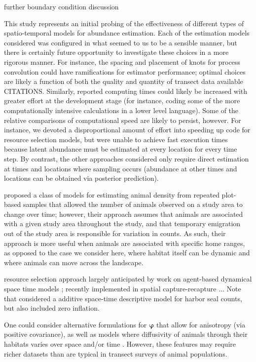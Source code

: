 \documentclass[times,mee,doublespace,]{besauth2}
\begin{document}
further boundary condition discussion

This study represents an initial probing of the effectiveness of different types of spatio-temporal models for abundance estimation.  Each of the estimation models considered was configured in what seemed to us to be a sensible manner, but there is certainly future opportunity to investigate these choices in a more rigorous manner.  For instance, the spacing and placement of knots for process convolution could have ramifications for estimator performance; optimal choices are likely a function of both the quality and quantity of transect data available CITATIONS.  Similarly, reported computing times could likely be increased with greater effort at the development stage (for instance, coding some of the more computationally intensive calculations in a lower level language).  Some of the relative comparisons of computational speed are likely to persist, however. For instance, we devoted a disproportional amount of effort into speeding up code for resource selection models, but were unable to achieve fast execution times because latent abundance must be estimated at every location for every time step.  By contrast, the other approaches considered only require direct estimation at times and locations where sampling occurs (abundance at other times and locations can be obtained via posterior prediction).

\citet{ChandlerEtAl2011} proposed a class of models for estimating animal density from repeated plot-based samples that allowed the number of animals observed on a study area to change over time; however, their approach assumes that animals are associated with a given study area throughout the study, and that temporary emigration out of the study area is responsible for variation in counts.  As such, their approach is more useful when animals are associated with specific home ranges, as opposed to the case we consider here, where habitat itself can be dynamic and where animals can move across the landscape.

resource selection approach largely anticipated by work on agent-based dynamical space time models  \citep{HootenWikle2010}; recently implemented in spatial capture-recapture \citep{RoyleEtAl2013}... Note that \citet{VerHoefJansen2007} considered a additive space-time descriptive model for harbor seal counts, but also included zero inflation.

One could consider alternative formulations for $\boldsymbol{\varphi}$ that allow for anisotropy (via positive covariance), as well as models where diffusivity of animals through their habitats varies over space and/or time \citep[see e.g.][]{WikleEtAl2001}.  However, these features may require richer datasets than are typical in transect surveys of animal populations.
\end{document}
